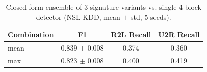 \begin{table}[t]
\centering
\caption{Closed-form ensemble of 3 signature variants vs. single 4-block detector (NSL-KDD, mean $\pm$ std, 5 seeds).}
\label{tab:ensemble}
\begin{tabular}{lccc}
\toprule
Combination & F1 & R2L Recall & U2R Recall \\
\midrule
mean & 0.839 $\pm$ 0.008 & 0.374 & 0.360 \\
max & 0.823 $\pm$ 0.008 & 0.400 & 0.419 \\
\bottomrule
\end{tabular}
\end{table}